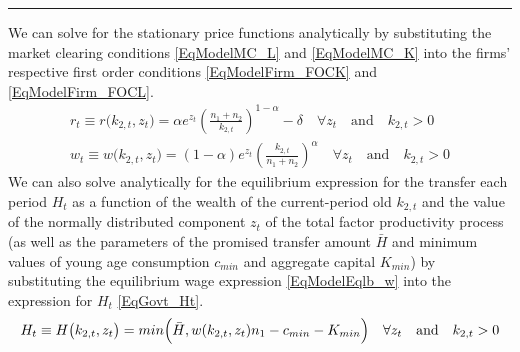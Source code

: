 \documentclass[letterpaper,12pt]{article}
\theoremstyle{definition}
\begin{document}
    \vspace{-2mm}
    \hrule
    \vspace{5mm}
    \begin{spacing}{1.5}

    We can solve for the stationary price functions analytically by substituting the market clearing conditions \eqref{EqModelMC_L} and \eqref{EqModelMC_K} into the firms' respective first order conditions \eqref{EqModelFirm_FOCK} and \eqref{EqModelFirm_FOCL}.
    \begin{gather}
      r_t\equiv r\bigl(k_{2,t}, z_t\bigr) = \alpha e^{z_t}\left(\frac{n_1 + n_2}{k_{2,t}}\right)^{1-\alpha} - \delta \quad\forall z_t \quad\text{and}\quad k_{2,t}>0 \label{EqModelEqlb_r} \\
      w_t\equiv w\bigl(k_{2,t}, z_t\bigr) = (1-\alpha)e^{z_t}\left(\frac{k_{2,t}}{n_1 + n_2}\right)^\alpha \quad\forall z_t \quad\text{and}\quad k_{2,t}>0 \label{EqModelEqlb_w}
    \end{gather}
    We can also solve analytically for the equilibrium expression for the transfer each period $H_t$ as a function of the wealth of the current-period old $k_{2,t}$ and the value of the normally distributed component $z_t$ of the total factor productivity process (as well as the parameters of the promised transfer amount $\bar{H}$ and minimum values of young age consumption $c_{min}$ and aggregate capital $K_{min}$)  by substituting the equilibrium wage expression \eqref{EqModelEqlb_w} into the expression for $H_t$ \eqref{EqGovt_Ht}.
    \begin{equation}\label{EqModelEqlb_H}
      H_t \equiv H\bigl(k_{2,t}, z_t\bigr) = min\Bigl(\bar{H}, w(k_{2,t},z_t)n_1 - c_{min} - K_{min}\Bigr) \quad\forall z_t \quad\text{and}\quad k_{2,t}>0
    \end{equation}


\end{spacing}
\end{document}
